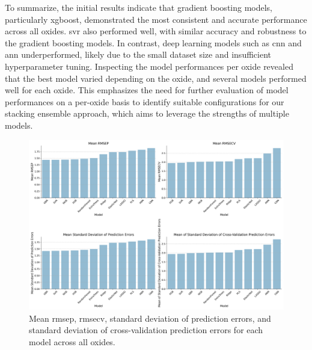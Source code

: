 To summarize, the initial results indicate that gradient boosting models, particularly \gls{xgboost}, demonstrated the most consistent and accurate performance across all oxides.
\gls{svr} also performed well, with similar accuracy and robustness to the gradient boosting models.
In contrast, deep learning models such as \gls{cnn} and \gls{ann} underperformed, likely due to the small dataset size and insufficient hyperparameter tuning.
Inspecting the model performances per oxide revealed that the best model varied depending on the oxide, and several models performed well for each oxide.
This emphasizes the need for further evaluation of model performances on a per-oxide basis to identify suitable configurations for our stacking ensemble approach, which aims to leverage the strengths of multiple models.

\begin{figure}[h]
    \centering
    \includegraphics[width=\textwidth]{images/init_results_means.png}
    \caption{Mean \gls{rmsep}, \gls{rmsecv}, standard deviation of prediction errors, and standard deviation of cross-validation prediction errors for each model across all oxides.}
    \label{fig:init_results_rmses}
\end{figure}

